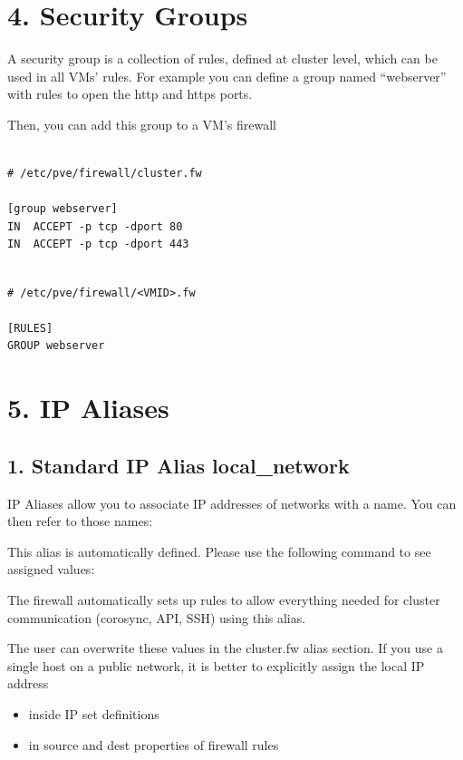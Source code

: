 \section{4. Security Groups}

A security group is a collection of rules, defined at cluster level, which can be used in all VMs' rules. For example you can define a group named “webserver” with rules to open the http and https ports.

Then, you can add this group to a VM’s firewall

\begin{lstlisting}

# /etc/pve/firewall/cluster.fw

[group webserver]
IN  ACCEPT -p tcp -dport 80
IN  ACCEPT -p tcp -dport 443

\end{lstlisting}

\begin{lstlisting}

# /etc/pve/firewall/<VMID>.fw

[RULES]
GROUP webserver

\end{lstlisting}


\section{5. IP Aliases}

\subsection{1. Standard IP Alias local_network}

IP Aliases allow you to associate IP addresses of networks with a name. You can then refer to those names:

This alias is automatically defined. Please use the following command to see assigned values:

The firewall automatically sets up rules to allow everything needed for cluster communication (corosync, API, SSH) using this alias.

The user can overwrite these values in the cluster.fw alias section. If you use a single host on a public network, it is better to explicitly assign the local IP address

\begin{itemize}[leftmargin=2cm]

	\item inside IP set definitions

	\item in source and dest properties of firewall rules

\end{itemize}

